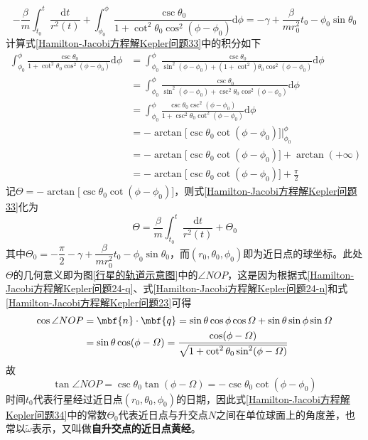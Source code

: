 \begin{equation}
	-\frac{\beta}{m}\int_{t_0}^t \frac{\mathrm{d}t}{r^2(t)} + \int_{\phi_0}^\phi \frac{\csc\theta_0}{1+\cot^2\theta_0\cos^2(\phi-\phi_0)}\mathrm{d}\phi = -\gamma+\frac{\beta}{mr_0^2}t_0-\phi_0\sin\theta_0
	\label{Hamilton-Jacobi方程解Kepler问题33}
\end{equation}
计算式\eqref{Hamilton-Jacobi方程解Kepler问题33}中的积分如下
\begin{align*}
	\int_{\phi_0}^\phi \frac{\csc\theta_0}{1+\cot^2\theta_0\cos^2(\phi-\phi_0)}\mathrm{d}\phi & = \int_{\phi_0}^\phi \frac{\csc\theta_0}{\sin^2(\phi-\phi_0)+(1+\cot^2)\theta_0\cos^2(\phi-\phi_0)} \mathrm{d}\phi \\
	& = \int_{\phi_0}^\phi \frac{\csc\theta_0}{\sin^2(\phi-\phi_0)+\csc^2\theta_0\cos^2(\phi-\phi_0)} \mathrm{d}\phi \\
	& = \int_{\phi_0}^\phi \frac{\csc\theta_0\csc^2(\phi-\phi_0)}{1+\csc^2\theta_0\cot^2(\phi-\phi_0)} \mathrm{d}\phi \\
	& = -\arctan\big[\csc\theta_0\cot(\phi-\phi_0)\big]\bigg|_{\phi_0}^\phi \\
	& = -\arctan\big[\csc\theta_0\cot(\phi-\phi_0)\big]+\arctan(+\infty) \\
	& = -\arctan\big[\csc\theta_0\cot(\phi-\phi_0)\big] + \frac{\pi}{2}
\end{align*}
记$\displaystyle \varTheta = -\arctan\big[\csc\theta_0\cot(\phi-\phi_0)\big]$，则式\eqref{Hamilton-Jacobi方程解Kepler问题33}化为
\begin{equation}
	\varTheta = \frac{\beta}{m}\int_{t_0}^t \frac{\mathrm{d}t}{r^2(t)}+\varTheta_0
	\label{Hamilton-Jacobi方程解Kepler问题34}
\end{equation}
其中$\varTheta_0=-\dfrac{\pi}{2}-\gamma+\dfrac{\beta}{mr_0^2}t_0-\phi_0\sin\theta_0$，而$(r_0,\theta_0,\phi_0)$即为近日点的球坐标。此处$\varTheta$的几何意义即为图\ref{行星的轨道示意图}中的$\angle NOP$，这是因为根据式\eqref{Hamilton-Jacobi方程解Kepler问题24-q}、式\eqref{Hamilton-Jacobi方程解Kepler问题24-n}和式\eqref{Hamilton-Jacobi方程解Kepler问题23}可得
\begin{align*}
	\cos \angle NOP & = \mbf{n}\cdot \mbf{q} = \sin\theta\cos\phi\cos\varOmega+ \sin\theta\sin\phi\sin\varOmega \\
	& = \sin\theta\cos(\phi-\varOmega) = \frac{\cos(\phi-\varOmega)}{\sqrt{1+\cot^2\theta_0\sin^2(\phi-\varOmega)}}
\end{align*}
故
\begin{equation*}
	\tan\angle NOP = \csc\theta_0\tan(\phi-\varOmega) = -\csc\theta_0\cot(\phi-\phi_0)
\end{equation*}
时间$t_0$代表行星经过近日点$(r_0,\theta_0,\phi_0)$的日期，因此式\eqref{Hamilton-Jacobi方程解Kepler问题34}中的常数$\varTheta_0$代表近日点与升交点$N$之间在单位球面上的角度差，也常以$\tilde{\omega}$表示，又叫做{\bf 自升交点的近日点黄经}。

